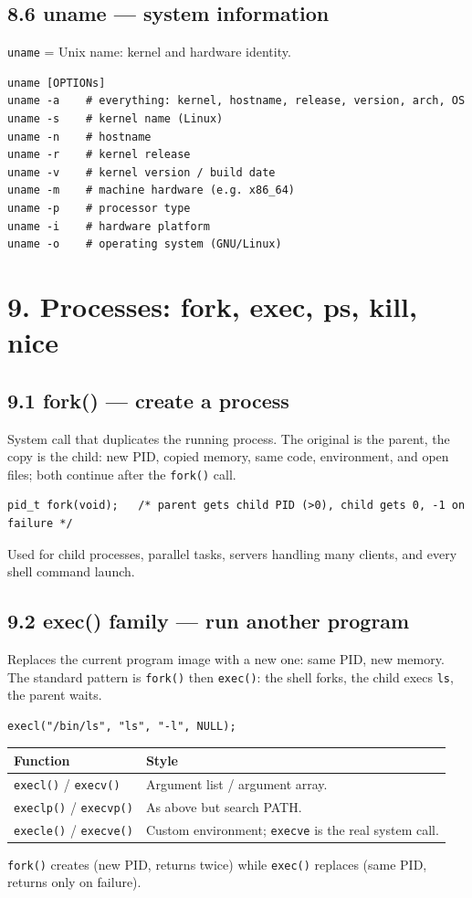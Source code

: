 \documentclass[11pt,a4paper]{article}
\newcommand{\cmd}[1]{\texttt{#1}}
\begin{document}
\subsection{8.6 uname --- system information}
\cmd{uname} = Unix name: kernel and hardware identity.
\begin{lstlisting}
uname [OPTIONs]
uname -a    # everything: kernel, hostname, release, version, arch, OS
uname -s    # kernel name (Linux)
uname -n    # hostname
uname -r    # kernel release
uname -v    # kernel version / build date
uname -m    # machine hardware (e.g. x86_64)
uname -p    # processor type
uname -i    # hardware platform
uname -o    # operating system (GNU/Linux)
\end{lstlisting}

\section{9. Processes: fork, exec, ps, kill, nice}

\subsection{9.1 fork() --- create a process}
System call that duplicates the running process. The original is the parent, the copy is the child: new PID, copied memory, same code, environment, and open files; both continue after the \cmd{fork()} call.
\begin{lstlisting}
pid_t fork(void);   /* parent gets child PID (>0), child gets 0, -1 on failure */
\end{lstlisting}
Used for child processes, parallel tasks, servers handling many clients, and every shell command launch.

\subsection{9.2 exec() family --- run another program}
Replaces the current program image with a new one: same PID, new memory. The standard pattern is \cmd{fork()} then \cmd{exec()}: the shell forks, the child execs \cmd{ls}, the parent waits.
\begin{lstlisting}
execl("/bin/ls", "ls", "-l", NULL);
\end{lstlisting}
\begin{center}
\small
\begin{tabularx}{\textwidth}{lX}
\toprule
Function & Style \\
\midrule
\cmd{execl()} / \cmd{execv()} & Argument list / argument array. \\
\cmd{execlp()} / \cmd{execvp()} & As above but search PATH. \\
\cmd{execle()} / \cmd{execve()} & Custom environment; \cmd{execve} is the real system call. \\
\bottomrule
\end{tabularx}
\end{center}
\cmd{fork()} creates (new PID, returns twice) while \cmd{exec()} replaces (same PID, returns only on failure).
\end{document}
